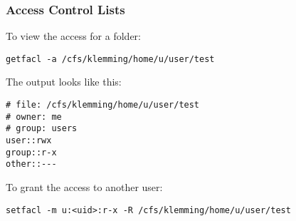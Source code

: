 \begin{frame}[fragile]
\frametitle{Access Control Lists}

\begin{exampleblock}{To view the access for a folder:}
\begin{verbatim}
getfacl -a /cfs/klemming/home/u/user/test
\end{verbatim}
\end{exampleblock}

\begin{exampleblock}{The output looks like this:}
\begin{verbatim}
# file: /cfs/klemming/home/u/user/test
# owner: me
# group: users
user::rwx
group::r-x
other::---
\end{verbatim}
\end{exampleblock}

\begin{exampleblock}{To grant the access to another user:}
\begin{verbatim}
setfacl -m u:<uid>:r-x -R /cfs/klemming/home/u/user/test
\end{verbatim}
\end{exampleblock}

\end{frame}



